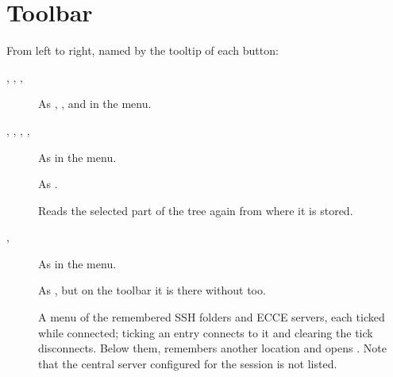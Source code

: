 \section{Toolbar}
From left to right, named by the tooltip of each button:
\begin{description}
	\item[, , , ] As , ,  and  in the  menu.
	\item[, , , , ] As in the  menu.
	\item[] As .
	\item[] Reads the selected part of the tree again from where it is stored.
	\item[, ] As in the  menu.
	\item[] As , but on the toolbar it is there without  too.
	\item[] A menu of the remembered SSH folders and ECCE servers, each ticked while connected; ticking an entry connects to it and clearing the tick disconnects. Below them,  remembers another location and  opens . Note that the central server configured for the session is not listed.
\end{description}

